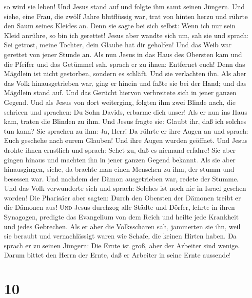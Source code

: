 so wird sie leben!  Und Jesus stand auf und folgte ihm
samt seinen Jüngern.  Und siehe, eine Frau, die zwölf
Jahre blutflüssig war, trat von hinten herzu und rührte den Saum seines
Kleides an.  Denn sie sagte bei sich selbst: Wenn ich nur
sein Kleid anrühre, so bin ich gerettet!  Jesus aber
wandte sich um, sah sie und sprach: Sei getrost, meine Tochter, dein
Glaube hat dir geholfen! Und das Weib war gerettet von jener Stunde an.
 Als nun Jesus in das Haus des Obersten kam und die
Pfeifer und das Getümmel sah,  sprach er zu ihnen:
Entfernet euch! Denn das Mägdlein ist nicht gestorben, sondern es
schläft. Und sie verlachten ihn.  Als aber das Volk
hinausgetrieben war, ging er hinein und faßte sie bei der Hand; und das
Mägdlein stand auf.  Und das Gerücht hiervon verbreitete
sich in jener ganzen Gegend.  Und als Jesus von dort
weiterging, folgten ihm zwei Blinde nach, die schrieen und sprachen: Du
Sohn Davids, erbarme dich unser!  Als er nun ins Haus
kam, traten die Blinden zu ihm. Und Jesus fragte sie: Glaubt ihr, daß
ich solches tun kann? Sie sprachen zu ihm: Ja, Herr!  Da
rührte er ihre Augen an und sprach: Euch geschehe nach eurem Glauben!
 Und ihre Augen wurden geöffnet. Und Jesus drohte ihnen
ernstlich und sprach: Sehet zu, daß es niemand erfahre! 
Sie aber gingen hinaus und machten ihn in jener ganzen Gegend bekannt.
 Als sie aber hinausgingen, siehe, da brachte man einen
Menschen zu ihm, der stumm und besessen war.  Und nachdem
der Dämon ausgetrieben war, redete der Stumme. Und das Volk verwunderte
sich und sprach: Solches ist noch nie in Israel gesehen worden!
 Die Pharisäer aber sagten: Durch den Obersten der
Dämonen treibt er die Dämonen aus!  \textsc{Und} Jesus
durchzog alle Städte und Dörfer, lehrte in ihren Synagogen, predigte das
Evangelium von dem Reich und heilte jede Krankheit und jedes Gebrechen.
 Als er aber die Volksscharen sah, jammerten sie ihn,
weil sie beraubt und vernachlässigt waren wie Schafe, die keinen Hirten
haben.  Da sprach er zu seinen Jüngern: Die Ernte ist
groß, aber der Arbeiter sind wenige.  Darum bittet den
Herrn der Ernte, daß er Arbeiter in seine Ernte aussende!

\hypertarget{section-9}{%
\section{10}\label{section-9}}

